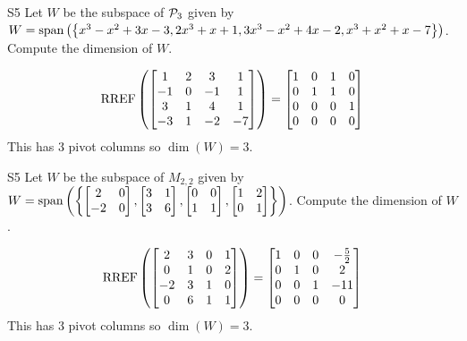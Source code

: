\begin{problem}{S5}
Let $W$ be the subspace of $\P_3$ given by $W={\rm span}\left( \left\{ x^3-x^2+3x-3, 2x^3+x+1, 3x^3-x^2+4x-2, x^3+x^2+x-7\right\}\right)$.  Compute the dimension of $W$.
\end{problem}
\begin{solution}
$$ \RREF \left( \begin{bmatrix} 1 & 2 & 3 & 1 \\ -1 & 0 & -1 & 1 \\ 3 & 1 & 4 & 1 \\ -3 & 1 & -2 & -7 \end{bmatrix} \right) =  \begin{bmatrix} 1 & 0 & 1 & 0 \\ 0 & 1 & 1 & 0 \\ 0 & 0 & 0 & 1 \\ 0 & 0 & 0 & 0\end{bmatrix}$$
This has 3 pivot columns so $\dim(W)=3$.
\end{solution}


\begin{problem}{S5}
Let $W$ be the subspace of $M_{2,2}$ given by $W={\rm span}\left(\left\{\begin{bmatrix} 2 & 0 \\ -2 & 0 \end{bmatrix}, \begin{bmatrix} 3 & 1 \\ 3 & 6 \end{bmatrix}, \begin{bmatrix} 0 & 0 \\ 1 & 1 \end{bmatrix}, \begin{bmatrix}1 & 2 \\ 0 & 1 \end{bmatrix}\right\}\right)$. Compute the dimension of $W$.
\end{problem}
\begin{solution}
$$\RREF\left( \begin{bmatrix} 2 & 3 & 0 & 1 \\ 0 & 1 & 0 & 2 \\ -2 & 3 & 1 & 0 \\ 0 & 6 & 1 & 1\end{bmatrix} \right) = \begin{bmatrix}1 & 0 & 0 & -\frac{5}{2} \\ 0 & 1 & 0 & 2 \\ 0 & 0 & 1 & -11\\ 0 & 0 & 0 & 0  \end{bmatrix} $$
This has 3 pivot columns so  $\dim(W) =3$.
\end{solution}


